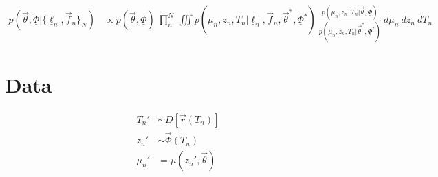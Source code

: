 \documentclass[12pt, onecolumn]{emulateapj}
\newcommand{\textul}{\underline}
\begin{document}
\begin{align}
p(\vec{\theta}, \textul{\Phi} | \{\textul{\ell}_{n}, \vec{f}_{n}\}_{N}) &\propto p(\vec{\theta}, \textul{\Phi})\ \prod_{n}^{N}\ \iiint p(\mu_{n}, z_{n}, T_{n} | \textul{\ell}_{n}, \vec{f}_{n}, \vec{\theta}^{*}, \textul{\Phi}^{*})\ \frac{p(\mu_{n}, z_{n}, T_{n} | \vec{\theta}, \textul{\Phi})}{p(\mu_{n}, z_{n}, T_{n} | \vec{\theta}^{*}, \textul{\Phi}^{*})}\ d\mu_{n}\ dz_{n}\ dT_{n}
\end{align}

\section{Data}
\label{sec:data}

\begin{align}
T_{n}' &\sim D[\vec{r}(T_{n})]\\
z_{n}' &\sim \vec{\Phi}(T_{n})\\
\mu_{n}' &= \mu(z_{n}', \vec{\theta})
\end{align}




\end{document}
